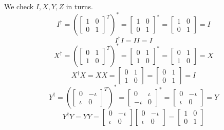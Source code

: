 \begin{example}
    We check $I,X,Y,Z$ in turns.
    \[
    I^{\dagger}=\left(\begin{bmatrix} 1 & 0 \\ 0 & 1 \end{bmatrix}^T \right)^* = \begin{bmatrix} 1 & 0 \\ 0 & 1 \end{bmatrix}^* = \begin{bmatrix} 1 & 0 \\ 0 & 1 \end{bmatrix} =I
    \]
    \[
    I^{\dagger}I=II=I
    \]
    \[
    X^{\dagger}=\left(\begin{bmatrix} 0 & 1 \\ 1 & 0 \end{bmatrix}^T \right)^* = \begin{bmatrix} 0 & 1 \\ 1 & 0 \end{bmatrix}^* = \begin{bmatrix} 0 & 1 \\ 1 & 0 \end{bmatrix} =X
    \]
    \[
    X^{\dagger}X=XX=\begin{bmatrix} 0 & 1 \\ 1 & 0 \end{bmatrix} = \begin{bmatrix} 0 & 1 \\ 0 & 1 \end{bmatrix} = I
    \]
    \[
    Y^{\dagger}=\left(\begin{bmatrix} 0 & -\iota \\ \iota & 0 \end{bmatrix}^T \right)^* = \begin{bmatrix} 0 & \iota \\ -\iota & 0 \end{bmatrix}^* = \begin{bmatrix} 0 & -\iota \\ \iota & 0 \end{bmatrix} =Y
    \]
    \[
    Y^{\dagger}Y=YY=\begin{bmatrix} 0 & -\iota \\ \iota & 0 \end{bmatrix} \begin{bmatrix} 0 & -\iota \\ \iota & 0 \end{bmatrix}=\begin{bmatrix} 1 & 0 \\ 0 & 1 \end{bmatrix}
\]
\end{example}
